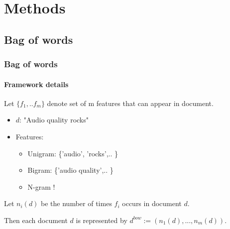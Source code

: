 \documentclass{beamer}
\begin{document}
\section{Methods}
\subsection{Bag of words}

\begin{frame}
\frametitle{Bag of words}
\framesubtitle{Framework details}

\begin{theorem}[1]
	Let $\{f_1,..f_m\}$ denote set of m features that can appear in document.
\end{theorem}
\pause

\begin{itemize}	
	\item $d$: "Audio quality rocks"
	\pause
	\item Features:
	\begin{itemize}
		\item Unigram: \{'audio', 'rocks',..  \}
		\item Bigram: \{'audio quality',.. \}
		\item N-gram !
	\end{itemize}
\end{itemize}

\pause
\begin{theorem}[2]
	Let $n_i(d)$ be the number of times $f_i$ occurs in document $d$.
\end{theorem}

\pause
\begin{Definition}[BOW]
	Then each document $d$ is represented by $d^{bow}:=(n_1(d),...,n_m(d))$.
\end{Definition}

\end{frame}
\end{document}
